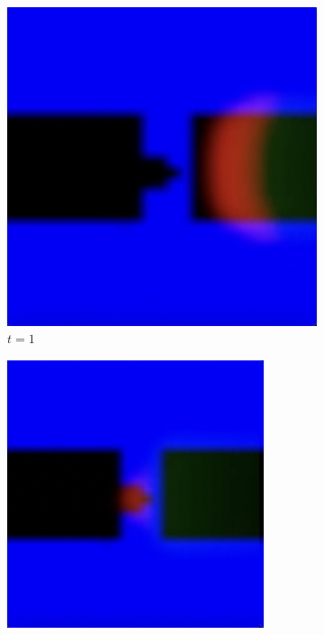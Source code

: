 \begin{figure}
	\centering
	\begin{subfigure}{0.24\textwidth}
		\includegraphics[width=\linewidth]{diode/easy/Screenshot 2024-03-09 at 16.21.56.png}
		\caption*{$t = 1$}
	\end{subfigure}
	\begin{subfigure}{0.24\textwidth}
		\includegraphics[width=\linewidth]{diode/easy/Screenshot 2024-03-09 at 16.22.24.png}

\end{subfigure}
\end{figure}
